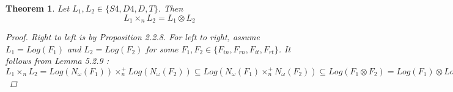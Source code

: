 \documentclass[12pt, a4paper]{scrartcl}
\newtheorem{theorem}[definition]{Theorem}
\begin{document}
    \begin{theorem}
        Let $L_1, L_2 \in \{S4, D4, D, T\}$. Then 
        $$L_1 \times_n L_2 = L_1 \otimes L_2$$

        \begin{proof}
            Right to left is by Proposition 2.2.8. \newline
            For left to right, assume $L_1 = Log(F_1)$ and $L_2 = Log(F_2)$ for some $F_1, F_2 \in \{F_{in}, F_{rn}, F_{it}, F_{rt}\}$.
            It follows from Lemma 5.2.9 : \newline
            $L_1 \times_n L_2 = Log(N_\omega(F_1)) \times^+_n Log(N_\omega(F_2)) \subseteq Log(N_\omega(F_1) \times^+_n N_\omega(F_2)) \subseteq Log(F_1 \otimes F_2) = Log(F_1) \otimes Log(F_2) = L_1 \otimes L_2$
        \end{proof}
    \end{theorem}
\end{document}
